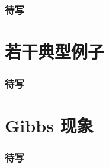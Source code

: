 \begin{frame}
\frametitle{待写}

\end{frame}


\section{若干典型例子}


\begin{frame}
\frametitle{待写}

\end{frame}


\section{Gibbs 现象}


\begin{frame}
\frametitle{待写}

\end{frame}



